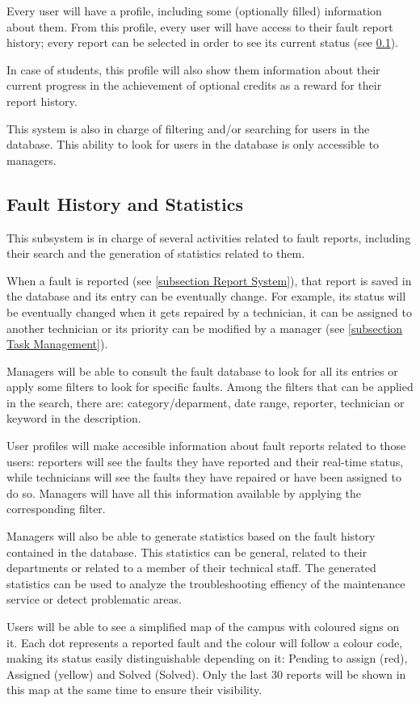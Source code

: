Every user will have a profile, including some (optionally filled) information about them. From this profile, every user will have access to their fault report history; every report can be selected in order to see its current status (see \ref{subsection Fault History and Statistics}). 

In case of students, this profile will also show them information about their current progress in the achievement of optional credits as a reward for their report history.

This system is also in charge of filtering and/or searching for users in the database. This ability to look for users in the database is only accessible to managers.

\subsection{Fault History and Statistics}
\label{subsection Fault History and Statistics}

This subsystem is in charge of several activities related to fault reports, including their search and the generation of statistics related to them.

When a fault is reported (see \ref{subsection Report System}), that report is saved in the database and its entry can be eventually change. For example, its status will be eventually changed when it gets repaired by a technician, it can be assigned to another technician or its priority can be modified by a manager (see \ref{subsection Task Management}).

Managers will be able to consult the fault database to look for all its entries or apply some filters to look for specific faults. Among the filters that can be applied in the search, there are: category/deparment, date range, reporter, technician or keyword in the description.

User profiles will make accesible information about fault reports related to those users: reporters will see the faults they have reported and their real-time status, while technicians will see the faults they have repaired or have been assigned to do so. Managers will have all this information available by applying the corresponding filter.

Managers will also be able to generate statistics based on the fault history contained in the database. This statistics can be general, related to their departments or related to a member of their technical staff. The generated statistics can be used to analyze the troubleshooting effiency of the maintenance service or detect problematic areas.

Users will be able to see a simplified map of the campus with coloured signs on it. Each dot represents a reported fault and the colour will follow a colour code, making its status easily distinguishable depending on it: Pending to assign (red), Assigned (yellow) and Solved (Solved). Only the last 30 reports will be shown in this map at the same time to ensure their visibility.

